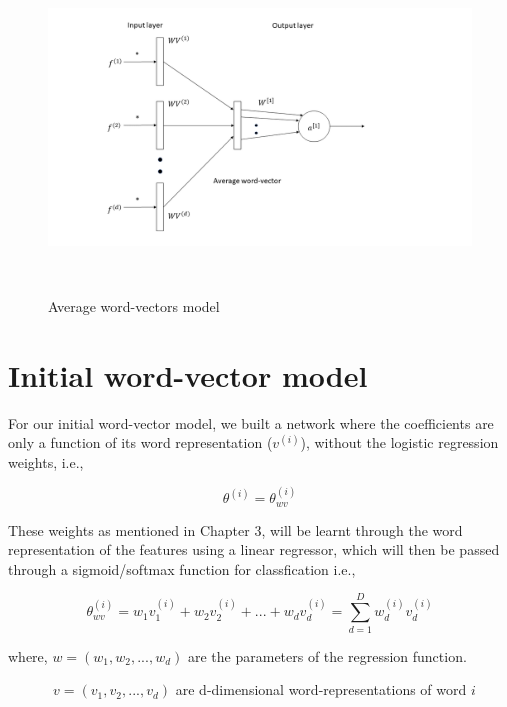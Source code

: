 \begin{figure}[htbp]
\centering
\includegraphics[width=16cm, height=8cm]{images/average-vectors2.png}\\
\centering
\caption{Average word-vectors model}
\label{fig:foo}
\end{figure}

\newpage
\section{Initial word-vector model}

For our initial word-vector model, we built a network where the coefficients are only a function of its word representation ($v^{(i)}$), without the logistic regression weights, i.e.,

\begin{equation}\label{lb1}
\theta^{(i)} = \theta_{wv}^{(i)}
\end{equation}

These weights as mentioned in Chapter 3, will be learnt through the word representation of the features using a linear regressor, which will then be passed through a sigmoid/softmax function for classfication i.e.,

\begin{equation}
\theta_{wv}^{(i)} = w_{1}v_{1}^{(i)} + w_{2}v_{2}^{(i)} + ... + w_{d}v_{d}^{(i)} = \sum_{d=1}^{D} w_{d}^{(i)}v_{d}^{(i)}
\end{equation}

where, $w = (w_{1}, w_{2}, ..., w_{d})$ are the parameters of the regression function. 

$\quad\qquad\  v= (v_{1}, v_{2}, ..., v_{d})$ are d-dimensional word-representations of word $i$\\

